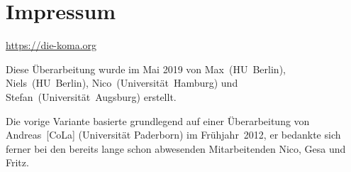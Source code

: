 \chapter{Impressum}
\begin{center}
    \url{https://die-koma.org}
\end{center}

\vspace{2em}

\noindent Diese Überarbeitung wurde im Mai 2019 von \mbox{Max (HU Berlin)}, \mbox{Niels (HU Berlin)}, \mbox{Nico (Universität Hamburg)} und \mbox{Stefan (Universität Augsburg)} erstellt.

\vspace{1em}

\noindent Die vorige Variante basierte grundlegend auf einer Überarbeitung von \mbox{Andreas [CoLa]} (Universität Paderborn) im Frühjahr~2012, er bedankte sich ferner bei den bereits lange schon abwesenden Mitarbeitenden Nico, Gesa und Fritz.
